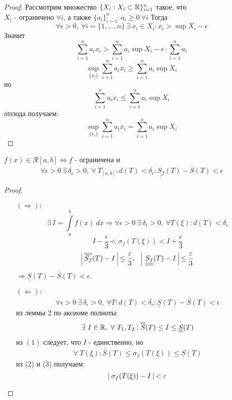 \begin{proof}
    Рассмотрим множество $\{X_i: X_i\subset \mathbb{R}\}_{i=1}^n$ такое, что\\
    $X_i$ - ограничено $\forall i$, а также $\{a_i\}_{i=1}^n: a_i\geq 0 \ \forall i$ Тогда
    \[\forall \epsilon>0,\ \forall i=\{1,\dots,n\}\ \exists\ x_i\in X_i: x_i>\sup X_i-\epsilon\] 
    Значит 
    \[\sum\limits_{i=1}^{n}a_i x_i>\sum\limits_{i=1}^{n}a_i \sup X_i-\epsilon\cdot \sum\limits_{i=1}^{n}a_i\] 
    \[\sup\limits_{\{x_i\}} \sum\limits_{i=1}^{n}a_i x_i\geq \sum\limits_{i=1}^{n}a_i \sup X_i\]
    но 
    \[\sum\limits_{i=1}^{n}a_i x_i \leq \sum\limits_{i=1}^{n} a_i\sup X_i\]
    отсюда получаем:
    \[\sup\limits_{\{x_i\}} \sum\limits_{i=1}^{n}a_i x_i=\sum\limits_{i=1}^{n}a_i \sup X_i\]
\end{proof} 
\begin{theorem}
    $f(x)\in \mathcal{R}[a,b] \Leftrightarrow f$ - ограничена и 
    \[\forall \epsilon>0\ \exists\ \delta_{\epsilon}>0,\ \forall\ T_{[a,b]}: d(T)<\delta_{\epsilon}: \underline{\underline{S_f}}(T)-\overline{\overline{S}}(T)<\epsilon\]
\end{theorem} 
\begin{proof} \ 
    \begin{itemize}
        \item[$(\Rightarrow):$]
        \[\exists\ I=\int\limits_{a}^{b}f(x)\ dx \Rightarrow \forall \epsilon>0\ \exists\ \delta_{\epsilon}>0,\ \forall T(\xi): d(T)<\delta_{\epsilon}\]
        \[I-\frac{\epsilon}{3}<\sigma_f(T(\xi))<I+\frac{\epsilon}{3}\]
        \[\vline\ \overline{\overline{S_f}}(T)-I\ \vline \leq \frac{\epsilon}{3},\ \ \  \vline\ \underline{\underline{S_f}}(T)-I\ \vline \leq \frac{\epsilon}{3}\]
        $\Rightarrow \underline{\underline{S}}(T)-\overline{\overline{S}}(T)<\epsilon$.
        \item[$(\Leftarrow):$]
        \begin{equation}
            \forall \epsilon>0\ \exists\ \delta_{\epsilon}>0,\ \forall T: d(T)<\delta_{\epsilon}: \underline{\underline{S}}(T)-\overline{\overline{S}}(T)<\epsilon
        \end{equation}
        из леммы 2 по аксиоме полноты: 
        \begin{equation}
            \exists\ I\in \R,\ \forall\ T_1, T_2: \overline{\overline{S}}(T)\leq I\leq\underline{\underline{S}}(T)
        \end{equation}
        из $(1)$ следует, что $I$ - единственно, но 
        \begin{equation}
            \forall\ T(\xi): \overline{\overline{S}}(T)\leq \sigma_f(T(\xi))\leq \underline{\underline{S}}(T)
        \end{equation}
         из (2) и (3) получаем:
        \[\vline\ \sigma_f(T(\xi))-I \ \vline<\epsilon\]    
    \end{itemize}
\end{proof} 
